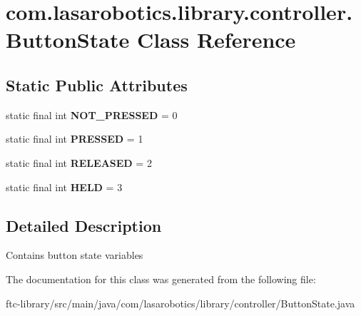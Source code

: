 \hypertarget{classcom_1_1lasarobotics_1_1library_1_1controller_1_1_button_state}{}\section{com.\+lasarobotics.\+library.\+controller.\+Button\+State Class Reference}
\label{classcom_1_1lasarobotics_1_1library_1_1controller_1_1_button_state}
\subsection*{Static Public Attributes}
\begin{DoxyCompactItemize}
\item 
\hypertarget{classcom_1_1lasarobotics_1_1library_1_1controller_1_1_button_state_a8b0f56c276addaebbe8d446445756156}{}static final int {\bfseries N\+O\+T\+\_\+\+P\+R\+E\+S\+S\+E\+D} = 0\label{classcom_1_1lasarobotics_1_1library_1_1controller_1_1_button_state_a8b0f56c276addaebbe8d446445756156}

\item 
\hypertarget{classcom_1_1lasarobotics_1_1library_1_1controller_1_1_button_state_a197fb2266077e004fcb98bbf5971aae5}{}static final int {\bfseries P\+R\+E\+S\+S\+E\+D} = 1\label{classcom_1_1lasarobotics_1_1library_1_1controller_1_1_button_state_a197fb2266077e004fcb98bbf5971aae5}

\item 
\hypertarget{classcom_1_1lasarobotics_1_1library_1_1controller_1_1_button_state_a0fd4b721d96b29b5d1395b6f3ddd8446}{}static final int {\bfseries R\+E\+L\+E\+A\+S\+E\+D} = 2\label{classcom_1_1lasarobotics_1_1library_1_1controller_1_1_button_state_a0fd4b721d96b29b5d1395b6f3ddd8446}

\item 
\hypertarget{classcom_1_1lasarobotics_1_1library_1_1controller_1_1_button_state_ab5f62c1fb1d09b110d0b171531390bb8}{}static final int {\bfseries H\+E\+L\+D} = 3\label{classcom_1_1lasarobotics_1_1library_1_1controller_1_1_button_state_ab5f62c1fb1d09b110d0b171531390bb8}

\end{DoxyCompactItemize}


\subsection{Detailed Description}
Contains button state variables 

The documentation for this class was generated from the following file\+:\begin{DoxyCompactItemize}
\item 
ftc-\/library/src/main/java/com/lasarobotics/library/controller/Button\+State.\+java\end{DoxyCompactItemize}
